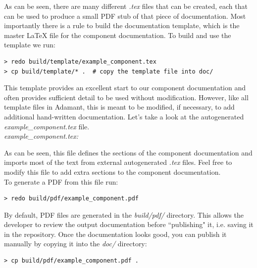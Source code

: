 As can be seen, there are many different \textit{.tex} files that can be created, each that can be used to produce a small PDF stub of that piece of documentation. Most importantly there is a rule to build the documentation template, which is the master \LaTeX{} file for the component documentation. To build and use the template we run:

\vspace{5mm} %
\begin{verbatim}
> redo build/template/example_component.tex
> cp build/template/* .  # copy the template file into doc/
\end{verbatim}
\vspace{5mm} %

This template provides an excellent start to our component documentation and often provides sufficient detail to be used without modification. However, like all template files in Adamant, this is meant to be modified, if necessary, to add additional hand-written documentation. Let's take a look at the autogenerated \textit{example\_component.tex} file. \\

\textit{example\_component.tex:}

As can be seen, this file defines the sections of the component documentation and imports most of the text from external autogenerated \textit{.tex} files. Feel free to modify this file to add extra sections to the component documentation. \\

To generate a PDF from this file run:

\vspace{5mm} %
\begin{verbatim}
> redo build/pdf/example_component.pdf
\end{verbatim}
\vspace{5mm} %

By default, PDF files are generated in the \textit{build/pdf/} directory. This allows the developer to review the output documentation before ``publishing" it, i.e. saving it in the repository. Once the documentation looks good, you can publish it manually by copying it into the \textit{doc/} directory:

\vspace{5mm} %
\begin{verbatim}
> cp build/pdf/example_component.pdf .
\end{verbatim}
\vspace{5mm} %

